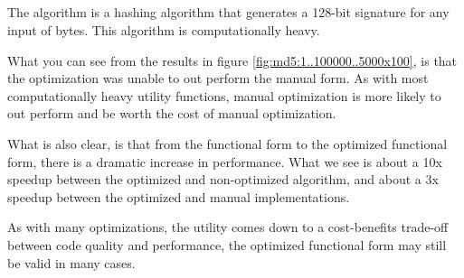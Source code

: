 \subsection{\mdfive}
The \mdfive algorithm \cite{mdfive92} is a hashing algorithm that generates a 128-bit signature for any input of bytes. This algorithm is computationally heavy.

What you can see from the results in figure \ref{fig:md5:1..100000..5000x100}, is that the optimization was unable to out perform the manual form.  As with most computationally heavy utility functions, manual optimization is more likely to out perform and be worth the cost of manual optimization.  

What is also clear, is that from the functional form to the optimized functional form, there is a dramatic increase in performance.  What we see is about a 10x speedup between the optimized and non-optimized algorithm, and about a 3x speedup between the optimized and manual implementations.  

As with many optimizations, the utility comes down to a cost-benefits trade-off between code quality and performance, the optimized functional form may still be valid in many cases.